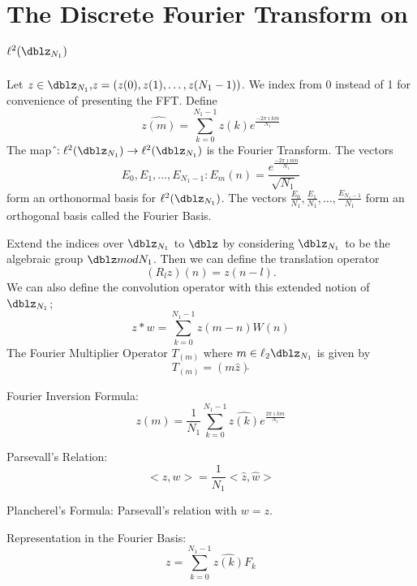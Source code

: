 \section{The Discrete Fourier Transform on $\ell^2(\dblz_{N_1})$} Let $z \in \dblz_{N_1} ,\!
z=(z(0),z(1),\ldots,z(N_1-1))$.  We index from 0 instead of 1
for convenience of presenting the FFT. Define
\begin{equation*}
\widehat{z(m)}=\sum\limits_{k=0}^{N_1-1} z(k)e^{ \frac{-2 \pi
\imath k m}{N_1}}
\end{equation*}
The map $\hat \!: \ell^2(\dblz_{N_1}) \rightarrow
\ell^2(\dblz_{N_1})$ is the Fourier Transform. The vectors
\begin{equation*}
E_0,E_1, \ldots,E_{N_1 -1}  :\!  E_m(n)=\frac{e^\frac{-2 \pi
\imath m n}{N_1}}{\sqrt{N_1}}
\end{equation*}
form an orthonormal basis for $\ell^2(\dblz_{N_1})$. The
vectors $ \frac{E_0}{N_1},\frac{E_1}{N_1}, \ldots,\frac{E_{N_1
-1}}{N_1}$ form an orthogonal basis called the Fourier Basis.

Extend the indices over $\dblz_{N_1}$ to $\dblz$ by considering
$\dblz_{N_1}$ to be the algebraic group $\dblz mod N_1$.  Then
we can define the translation operator
\begin{equation*}
(R_l z)(n)=z(n-l).
\end{equation*}
We can also define the convolution operator with this extended
notion of $\dblz_{N_1}$;
\begin{equation*}
z * w = \sum \limits_{k=0}^{N_1-1} z(m-n)W(n)
\end{equation*}
The Fourier Multiplier Operator $T_{(m)}$ where $m \in
\ell_2{\dblz_{N_1}}$ is given by
\begin{equation*}
T_{(m)}=(m\hat z)\check{}
\end{equation*}

Fourier Inversion Formula:
\begin{equation*}
z(m)=\frac {1}{N_1}\sum\limits_{k=0}^{N_1-1} \hat{z(k)} e^{
\frac{2 \pi \imath k m}{N_1}}
\end{equation*}

Parsevall's Relation:
\begin{equation*}
<z,w>=\frac{1}{N_1}<\hat z,\hat w>
\end{equation*}

Plancherel's Formula: Parsevall's relation with $w=z$.

Representation in the Fourier Basis:
\begin{equation*}
z=\sum \limits_{k=0}^{N_1-1} \hat{z(k)} F_k
\end{equation*}


